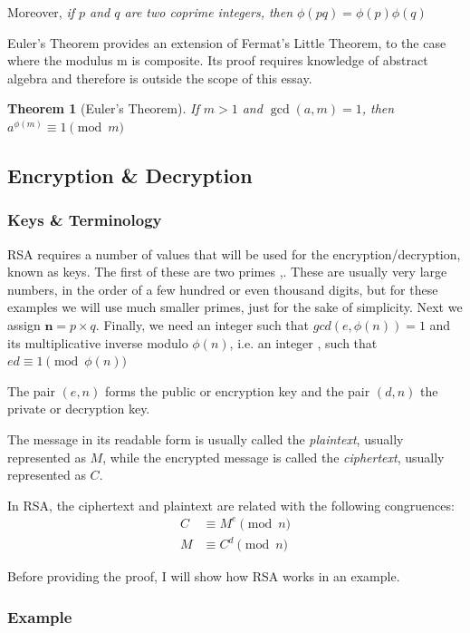 \documentclass[12pt, titlepage]{article}
\newtheorem{theorem}{Theorem}
\begin{document}
Moreover, \emph{if $p$ and $q$ are two coprime integers, then $\phi(pq) = \phi(p)
\phi(q)$}\autocite[107]{dence}

Euler's Theorem provides an extension of Fermat's Little Theorem, to the case where the
modulus m is composite. Its proof requires knowledge of abstract algebra and therefore is
outside the scope of this essay.
%
\begin{theorem}[Euler's Theorem]
    If $m>1$ and $\gcd(a, m) = 1$, then $a^{\phi(m)} \equiv 1 \pmod m$
\end{theorem}


\subsection{Encryption \& Decryption}

\subsubsection{Keys \& Terminology}

RSA requires a number of values that will be used for the encryption/decryption, known as
keys. The first of these are two primes ,. These are usually very large
numbers, in the order of a few hundred or even thousand digits, but for these examples we
will use much smaller primes, just for the sake of simplicity. Next we assign $\pmb{n}=p
\times q$.  Finally, we need an integer  such that $gcd(e, \phi (n)) = 1$ and its
multiplicative inverse modulo $\phi(n)$, i.e. an integer , such that $ed \equiv 1
\pmod{\phi(n)}$

The pair $(e, n)$ forms the public or encryption key and the pair $(d, n)$ the private or
decryption key.

The message in its readable form is usually called the \emph{plaintext}, usually represented
as $M$, while the encrypted message is called the \emph{ciphertext}, usually represented as
$C$.

In RSA, the ciphertext and plaintext are related with the following congruences:
%
\begin{align*}
    C &\equiv M^{e} \pmod{n}\\
    M &\equiv C^{d} \pmod{n}
\end{align*}
%

Before providing the proof, I will show how RSA works in an example.

\subsubsection{Example}
\end{document}
